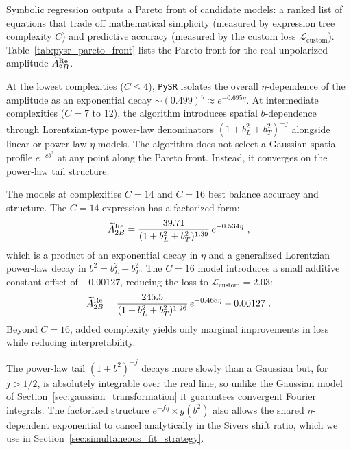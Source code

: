 Symbolic regression outputs a Pareto front of candidate models: a ranked list of equations that trade off mathematical simplicity (measured by expression tree complexity $C$) and predictive accuracy (measured by the custom loss $\mathcal{L}_{\text{custom}}$). Table~\ref{tab:pysr_pareto_front} lists the Pareto front for the real unpolarized amplitude $\widetilde{A}_{2B}^{\text{Re}}$.



At the lowest complexities ($C \leq 4$), \texttt{PySR} isolates the overall $\eta$-dependence of the amplitude as an exponential decay $\sim (0.499)^\eta \approx e^{-0.695\eta}$. At intermediate complexities ($C = 7$ to $12$), the algorithm introduces spatial $b$-dependence through Lorentzian-type power-law denominators $(1 + b_L^2 + b_T^2)^{-j}$ alongside linear or power-law $\eta$-models. The algorithm does not select a Gaussian spatial profile $e^{-cb^2}$ %
at any point along the Pareto front. Instead, it converges on the power-law tail structure.

The models at complexities $C = 14$ and $C = 16$ best balance accuracy and structure. The $C = 14$ expression has a factorized form:
\begin{equation}
    \widetilde{A}_{2B}^{\text{Re}} = \frac{39.71}{(1 + b_L^2 + b_T^2)^{1.39}} \, e^{-0.534\eta} \ ,
    \label{eq:pysr_C14}
\end{equation}
which is a product of an exponential decay in $\eta$ and a generalized Lorentzian power-law decay in $b^2 = b_L^2 + b_T^2$. The $C = 16$ model introduces a small additive constant offset of $-0.00127$, reducing the loss to $\mathcal{L}_{\text{custom}} = 2.03$:
\begin{equation}
    \widetilde{A}_{2B}^{\text{Re}} = \frac{245.5}{(1 + b_L^2 + b_T^2)^{1.26}} \, e^{-0.468\eta} - 0.00127 \ .
    \label{eq:pysr_C16}
\end{equation}
Beyond $C = 16$, added complexity yields only marginal improvements in loss while reducing interpretability.

The power-law tail $(1 + b^2)^{-j}$ decays more slowly than a Gaussian but, for $j > 1/2$, is absolutely integrable over the real line, so unlike the Gaussian model of Section~\ref{sec:gaussian_transformation} it guarantees convergent Fourier integrals. The factorized structure $e^{-f\eta} \times g(b^2)$ also allows the shared $\eta$-dependent exponential to cancel analytically in the Sivers shift ratio, which we use in Section~\ref{sec:simultaneous_fit_strategy}.

